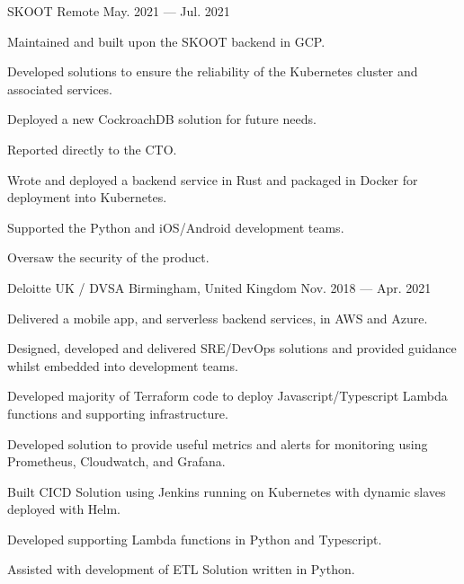 \begin{cventries}
    {SKOOT}
    {Remote}
    {May. 2021 — Jul. 2021}
    {
        \begin{cvitems}
        \item{Maintained and built upon the SKOOT backend in GCP.}
        \item{Developed solutions to ensure the reliability of the Kubernetes cluster and associated services.}
        \item{Deployed a new CockroachDB solution for future needs.}
        \item{Reported directly to the CTO.}
        \item{Wrote and deployed a backend service in Rust and packaged in Docker for deployment into Kubernetes.}
        \item{Supported the Python and iOS/Android development teams.}
        \item{Oversaw the security of the product.}
        \end{cvitems}
    }

    {Deloitte UK / DVSA}
    {Birmingham, United Kingdom}
    {Nov. 2018 — Apr. 2021}
    {
        \begin{cvitems}
        \item{Delivered a mobile app, and serverless backend services, in AWS and Azure.}
        \item{Designed, developed and delivered SRE/DevOps solutions and provided guidance whilst embedded into development teams.}
        \item{Developed majority of Terraform code to deploy Javascript/Typescript Lambda functions and supporting infrastructure.}
        \item{Developed solution to provide useful metrics and alerts for monitoring using Prometheus, Cloudwatch, and Grafana.}
        \item{Built CICD Solution using Jenkins running on Kubernetes with dynamic slaves deployed with Helm.}
        \item{Developed supporting Lambda functions in Python and Typescript.}
        \item{Assisted with development of ETL Solution written in Python.}
        \end{cvitems}
    }


\end{cventries}
